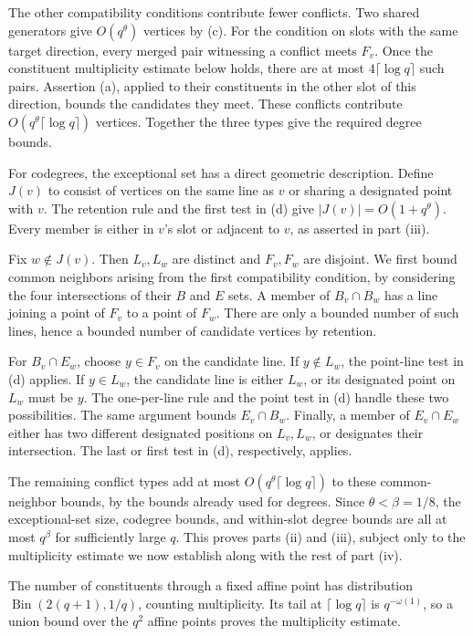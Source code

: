 The other compatibility conditions contribute fewer conflicts. Two
shared generators give $O(q^\theta)$ vertices by (c). For the condition
on slots with the same target direction, every merged pair witnessing
a conflict meets $F_v$. Once the constituent multiplicity estimate
below holds, there are at most $4\lceil\log q\rceil$ such pairs.
Assertion (a), applied to their constituents in the other slot of this
direction, bounds the candidates they meet. These conflicts contribute
$O(q^\theta\lceil\log q\rceil)$ vertices. Together the three types
give the required degree bounds.

For codegrees, the exceptional set has a direct geometric description.
Define $J(v)$ to consist of vertices on the same line as $v$ or sharing
a designated point with $v$. The retention rule and the first test in
(d) give $|J(v)|=O(1+q^\theta)$. Every member is either in $v$'s
slot or adjacent to $v$, as asserted in part (iii).

Fix $w\notin J(v)$. Then $L_v,L_w$ are distinct and $F_v,F_w$ are
disjoint. We first bound common neighbors arising from the first
compatibility condition, by considering the four intersections of their
$B$ and $E$ sets. A member of $B_v\cap B_w$ has a line joining a
point of $F_v$ to a point of $F_w$. There are only a bounded number of
such lines, hence a bounded number of candidate vertices by retention.

For $B_v\cap E_w$, choose $y\in F_v$ on the candidate line. If
$y\notin L_w$, the point-line test in (d) applies. If $y\in L_w$,
the candidate line is either $L_w$, or its designated point on $L_w$
must be $y$. The one-per-line rule and the point test in (d) handle
these two possibilities. The same argument bounds $E_v\cap B_w$.
Finally, a member of $E_v\cap E_w$ either has two different designated
positions on $L_v,L_w$, or designates their intersection. The last or
first test in (d), respectively, applies.

The remaining conflict types add at most
$O(q^\theta\lceil\log q\rceil)$ to these common-neighbor bounds,
by the bounds already used for degrees. Since $\theta<\beta=1/8$,
the exceptional-set size, codegree bounds, and within-slot degree bounds
are all at most $q^\beta$ for sufficiently large $q$. This proves
parts (ii) and (iii), subject only to the multiplicity estimate we now
establish along with the rest of part (iv).

The number of constituents through a fixed affine point has distribution
$\operatorname{Bin}(2(q+1),1/q)$, counting multiplicity. Its tail at
$\lceil\log q\rceil$ is $q^{-\omega(1)}$, so a union bound over
the $q^2$ affine points proves the multiplicity estimate.

